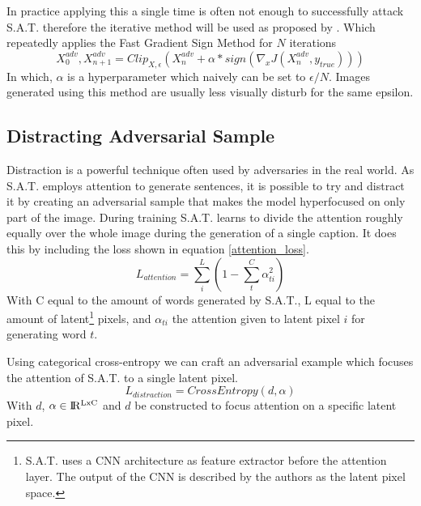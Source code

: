 In practice applying this a single time is often not enough to successfully attack S.A.T. therefore the iterative method will be used as proposed by \citeauthor{Kurakin}. Which repeatedly applies the Fast Gradient Sign Method for $N$ iterations
\begin{equation}
    X^{adv}_{0}, X^{adv}_{n + 1} = Clip_{X, \epsilon}(X^{adv}_{n} + \alpha * sign(\nabla_{x}J(X^{adv}_{n}, y_{true})))
    \label{IterativeMethod}
\end{equation}
In which, $\alpha$ is a hyperparameter which naively can be set to $\epsilon / N$. Images generated using this method are usually less visually disturb for the same epsilon.

\subsection*{Distracting Adversarial Sample}
Distraction is a powerful technique often used by adversaries in the real world. As S.A.T. employs attention to generate sentences, it is possible to try and distract it by creating an adversarial sample that makes the model hyperfocused on only part of the image. During training S.A.T. learns to divide the attention roughly equally over the whole image during the generation of a single caption. It does this by including the loss shown in equation \ref{attention_loss}.
\begin{equation}
    L_{attention} = \sum^{L}_i (1 - \sum^{C}_{t} \alpha_{ti}^2)
    \label{attention_loss}
\end{equation}
\noindent With C equal to the amount of words generated by S.A.T., L equal to the amount of latent\footnote{S.A.T. uses a CNN architecture as feature extractor before the attention layer. The output of the CNN is described by the authors as the latent pixel space.} pixels, and $\alpha_{ti}$ the attention given to latent pixel $i$ for generating word $t$.

Using categorical cross-entropy we can craft an adversarial example which focuses the attention of S.A.T. to a single latent pixel.
\begin{equation}
    L_{distraction} = CrossEntropy(d, \alpha)
    \label{distraction_loss}
\end{equation}
With $d$, $\alpha \in \rm I\!R^{LxC}$ and $d$ be constructed to focus attention on a specific latent pixel.

